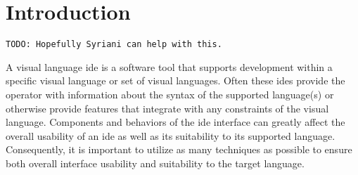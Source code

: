\section{Introduction} \label{sec:introduction}

\begin{verbatim}
TODO: Hopefully Syriani can help with this.
\end{verbatim}

A visual language \ac{ide} is a software tool that supports
development within a specific visual language or set of visual languages.
Often these \acp{ide} provide the operator with information about the
syntax of the supported language(s) or otherwise provide features that
integrate with any constraints of the visual language. Components and
behaviors of the \ac{ide} interface can greatly affect the overall
usability of an \ac{ide} as well as its suitability to its supported
language. Consequently, it is important to utilize as many techniques as
possible to ensure both overall interface usability and suitability to the
target language.
